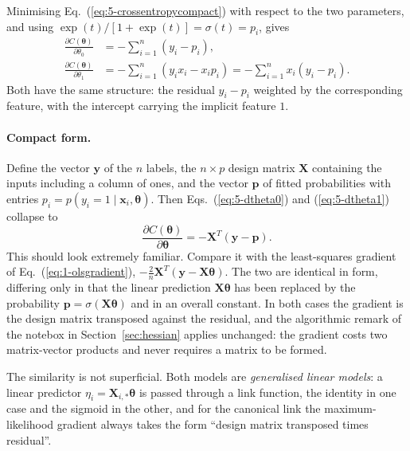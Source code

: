 Minimising Eq.~(\ref{eq:5-crossentropycompact}) with respect to the two
parameters, and using
$\exp(t)/[1+\exp(t)]=\sigma(t)=p_i$, gives
\begin{align}
  \frac{\partial C(\bm{\theta})}{\partial\theta_0}
   &= -\sum_{i=1}^{n}\left(y_i - p_i\right),
  \label{eq:5-dtheta0}\\
  \frac{\partial C(\bm{\theta})}{\partial\theta_1}
   &= -\sum_{i=1}^{n}\left(y_ix_i - x_ip_i\right)
    = -\sum_{i=1}^{n}x_i\left(y_i-p_i\right).
  \label{eq:5-dtheta1}
\end{align}
Both have the same structure: the residual $y_i-p_i$ weighted by the
corresponding feature, with the intercept carrying the implicit feature $1$.

\paragraph{Compact form.}
Define the vector $\bm{y}$ of the $n$ labels, the $n\times p$ design matrix
$\bm{X}$ containing the inputs including a column of ones, and the vector
$\bm{p}$ of fitted probabilities with entries
$p_i=p(y_i=1\mid\bm{x}_i,\bm{\theta})$.  Then
Eqs.~(\ref{eq:5-dtheta0}) and (\ref{eq:5-dtheta1}) collapse to
\begin{equation}
  \boxed{\;
  \frac{\partial C(\bm{\theta})}{\partial\bm{\theta}}
   = -\bm{X}^{T}\left(\bm{y}-\bm{p}\right) . \;}
  \label{eq:5-gradient}
\end{equation}
This should look extremely familiar.  Compare it with the least-squares
gradient of Eq.~(\ref{eq:1-olsgradient}),
$-\tfrac{2}{n}\bm{X}^{T}(\bm{y}-\bm{X}\bm{\theta})$.  The two are identical in
form, differing only in that the linear prediction $\bm{X}\bm{\theta}$ has
been replaced by the probability $\bm{p}=\sigma(\bm{X}\bm{\theta})$ and in an
overall constant.  In both cases the gradient is the design matrix transposed
against the residual, and the algorithmic remark of the notebox in
Section~\ref{sec:hessian} applies unchanged: the gradient costs two
matrix-vector products and never requires a matrix to be formed.

The similarity is not superficial.  Both models are \emph{generalised linear
models}: a linear predictor $\eta_i=\bm{X}_{i,\ast}\bm{\theta}$ is passed
through a link function, the identity in one case and the sigmoid in the
other, and for the canonical link the maximum-likelihood gradient always takes
the form ``design matrix transposed times residual''.


